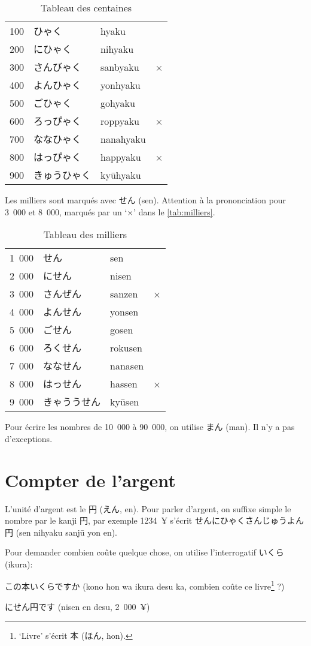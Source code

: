 \documentclass[a4paper,10pt,french,openany]{memoir}
\begin{document}
\begin{table}[htbp]
 \centering
 \begin{tabular}{clll}
  100 & ひゃく      &hyaku\\
  200 & にひゃく    &nihyaku\\
  300 & さんびゃく   &sanbyaku&×\\
  400 & よんひゃく   &yonhyaku\\
  500 & ごひゃく    &gohyaku\\
  600 & ろっぴゃく   &roppyaku&×\\
  700 & ななひゃく   &nanahyaku\\
  800 & はっぴゃく   &happyaku&×\\
  900 & きゅうひゃく &kyūhyaku\\
 \end{tabular}
 \caption{Tableau des centaines}
 \label{tab:centaines}
\end{table}

Les milliers sont marqués avec せん (sen). Attention à la prononciation pour 3~000 et 8~000, marqués par un `×' dans le \autoref{tab:milliers}.

\begin{table}[htbp]
 \centering
 \begin{tabular}{clll}
  1~000 & せん       &sen\\
  2~000 & にせん      &nisen\\
  3~000 & さんぜん    &sanzen&×\\
  4~000 & よんせん    &yonsen\\
  5~000 & ごせん      &gosen\\
  6~000 & ろくせん    &rokusen\\
  7~000 & ななせん    &nanasen\\
  8~000 & はっせん    &hassen&×\\
  9~000 & きゃううせん &kyūsen\\
 \end{tabular}
 \caption{Tableau des milliers}
 \label{tab:milliers}
\end{table}

Pour écrire les nombres de 10~000 à 90~000, on utilise まん (man). Il n'y a pas d'exceptions.

\section{Compter de l'argent}

L'unité d'argent est le 円 (えん, en). Pour parler d'argent, on suffixe simple le nombre par le kanji 円, par exemple 1234~¥ s'écrit せんにひゃくさんじゅうよん円 (sen nihyaku sanjū yon en).

Pour demander combien coûte quelque chose, on utilise l'interrogatif いくら (ikura):
\begin{cquote}{}
 この本いくらですか (kono hon wa ikura desu ka, combien coûte ce livre\footnote{`Livre' s'écrit 本 (ほん, hon).} ?)
  
 にせん円です (nisen en desu, 2~000~¥)
\end{cquote}
\end{document}
